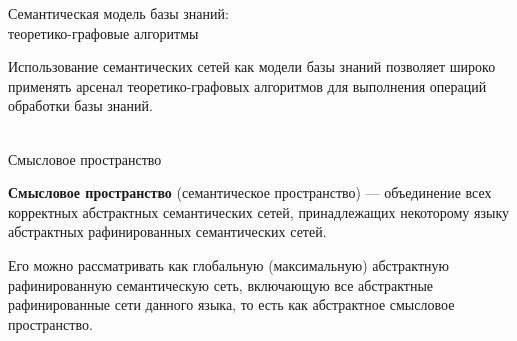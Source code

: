 \begin{frame}{Семантическая модель базы знаний:\\теоретико-графовые алгоритмы}
	\topline
	\justifying
	
	Использование семантических сетей как модели базы знаний позволяет широко применять арсенал теоретико-графовых алгоритмов для выполнения операций обработки базы знаний.
	
\end{frame}


\begin{frame}{\\Смысловое пространство}
	\topline
	\justifying
	
	\textbf{Смысловое пространство} (семантическое пространство) ---
	объединение всех корректных абстрактных семантических сетей, принадлежащих некоторому языку абстрактных рафинированных семантических сетей.
	
	\medskip
	Его можно рассматривать как глобальную (максимальную) абстрактную рафинированную семантическую сеть, включающую все абстрактные рафинированные сети данного языка, то есть как абстрактное смысловое пространство.
	
\end{frame}